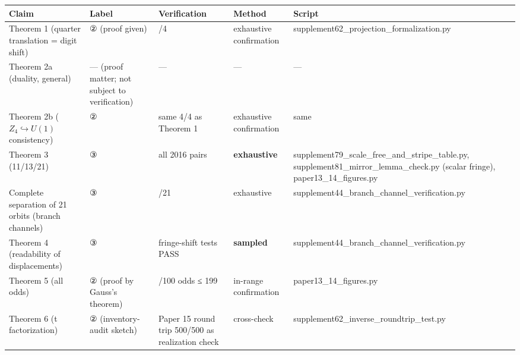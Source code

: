 \documentclass[
]{article}
\newcounter{none} %
\begin{document}
{\def\LTcaptype{none} %
\begin{longtable}[]{@{}
  >{\raggedright\arraybackslash}p{}
  >{\raggedright\arraybackslash}p{}
  >{\raggedright\arraybackslash}p{}
  >{\raggedright\arraybackslash}p{}
  >{\raggedright\arraybackslash}p{}@{}}
\toprule\noalign{}
\begin{minipage}[b]{\linewidth}\raggedright
Claim
\end{minipage} & \begin{minipage}[b]{\linewidth}\raggedright
Label
\end{minipage} & \begin{minipage}[b]{\linewidth}\raggedright
Verification
\end{minipage} & \begin{minipage}[b]{\linewidth}\raggedright
Method
\end{minipage} & \begin{minipage}[b]{\linewidth}\raggedright
Script
\end{minipage} \\
\midrule\noalign{}
\endhead
\bottomrule\noalign{}
\endlastfoot
Theorem 1 (quarter translation = digit shift) & ② (proof given) & 4/4 &
exhaustive confirmation & supplement62\_projection\_formalization.py \\
Theorem 2a (duality, general) & --- (proof matter; not subject to
verification) & --- & --- & --- \\
Theorem 2b (\(Z_4\hookrightarrow U(1)\) consistency) & ② & same 4/4 as
Theorem 1 & exhaustive confirmation & same \\
Theorem 3 (11/13/21) & ③ & all 2016 pairs & \textbf{exhaustive} &
supplement79\_scale\_free\_and\_stripe\_table.py,
supplement81\_mirror\_lemma\_check.py (scalar fringe),
paper13\_14\_figures.py \\
Complete separation of 21 orbits (branch channels) & ③ & 21/21 &
exhaustive & supplement44\_branch\_channel\_verification.py \\
Theorem 4 (readability of displacements) & ③ & 2 fringe-shift tests PASS
& \textbf{sampled} & supplement44\_branch\_channel\_verification.py \\
Theorem 5 (all odds) & ② (proof by Gauss's theorem) & 100/100 odds ≤ 199
& in-range confirmation & paper13\_14\_figures.py \\
Theorem 6 (t factorization) & ② (inventory-audit sketch) & Paper 15
round trip 500/500 as realization check & cross-check &
supplement62\_inverse\_roundtrip\_test.py \\
\end{longtable}
}
\end{document}
